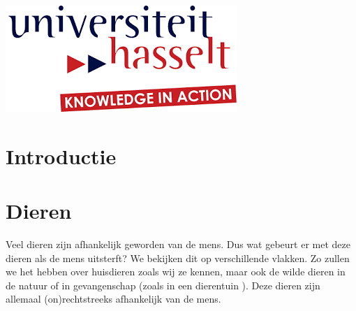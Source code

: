 \begin{titlepage}
\includegraphics{logo.png}\\[1cm] %
 

\vfill %

\end{titlepage}

\tableofcontents
\newpage

\section{Introductie}
\section{Dieren}
Veel dieren zijn afhankelijk geworden van de mens. Dus wat gebeurt er met deze dieren als de mens uitsterft? We bekijken dit op verschillende vlakken. Zo zullen we het hebben over huisdieren zoals wij ze kennen, maar ook de wilde dieren in de natuur of in gevangenschap (zoals in een dierentuin ). Deze dieren zijn allemaal (on)rechtstreeks afhankelijk van de mens.  \cite{ASAPScience,LAPOutbreak}
